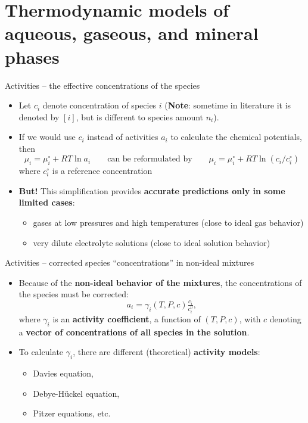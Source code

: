 \section{Thermodynamic models of aqueous, gaseous, and mineral phases}
%
%
\begin{frame}{Activities -- the effective concentrations of the species}
\begin{itemize}
\item Let $c_{i}$ denote concentration of species $i$ (\textbf{Note}: sometime in literature it is denoted by $[i]$, but is different to species amount $n_i$).
\pause
\item If we would use $c_{i}$ instead of activities $a_{i}$ to calculate the chemical potentials, then
\[
\mu_{i}=\mu_{i}^{\circ}+RT\ln a_{i} \qquad\text{can be reformulated by} \qquad \mu_{i}=\mu_{i}^{\circ}+RT\ln(c_{i}/c_{i}^{\circ})
\]
where $c_{i}^{\circ}$ is a reference concentration
%
\pause
\item \alert{\textbf{But!}} This simplification provides \textbf{accurate predictions only in some limited cases}:
%
\begin{itemize}
\item gases at low pressures and high temperatures \alert{(close to ideal gas behavior)}
\item very dilute electrolyte solutions \alert{(close to ideal solution behavior)}
\end{itemize}
\end{itemize}
\end{frame}
%
%
\begin{frame}{Activities -- corrected species “concentrations” in non-ideal mixtures}
\begin{itemize}
\item Because of the \textbf{non-ideal behavior of the mixtures}, the concentrations
of the species must be corrected:
%
\[
a_{i}=\gamma_{i}(T,P,c) \tfrac{c_i}{c_i^0},
\]
%
where $\gamma_{i}$ is an \alert{\textbf{activity coefficient}}, a function
of $(T,P,c)$, with $c$ denoting a {\bf vector of concentrations of all species in the solution}. 
\pause
\item To calculate $\gamma_{i}$, there are different (theoretical) \alert{\textbf{activity models}}:
\begin{itemize}
\item Davies equation,
\item Debye-H\"uckel equation,
\item Pitzer equations, etc.
\end{itemize}
\end{itemize}
\end{frame}
